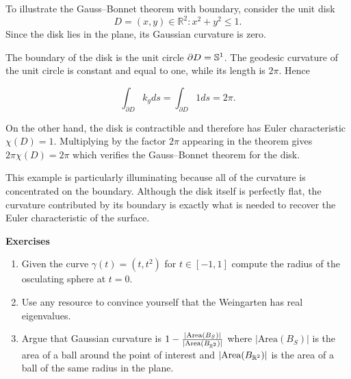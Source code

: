 To illustrate the Gauss--Bonnet theorem with boundary, consider the unit disk
$$D={(x,y)\in \mathbb{R}^2 : x^2+y^2\leq 1}.$$
Since the disk lies in the plane, its Gaussian curvature is zero.

The boundary of the disk is the unit circle $\partial D=\mathbb{S}^1$. The geodesic curvature of the unit circle is constant and equal to one, while its length is $2\pi$. Hence

$$\int_{\partial D} k_gds = \int_{\partial D} 1ds=2\pi.$$

On the other hand, the disk is contractible and therefore has Euler characteristic
$\chi(D)=1.$
Multiplying by the factor $2\pi$ appearing in the theorem gives
$2\pi\chi(D)=2\pi$
which verifies the Gauss--Bonnet theorem for the disk.

This example is particularly illuminating because all of the curvature is concentrated on the boundary. Although the disk itself is perfectly flat, the curvature contributed by its boundary is exactly what is needed to recover the Euler characteristic of the surface.


\noindent \textbf{Exercises}


\begin{enumerate}
	\item Given the curve $\gamma(t)=(t,t^2)$ for $t\in[-1,1]$ compute 
	the radius of the osculating sphere at $t=0.$
	
	\item Use any resource to convince yourself that the Weingarten has real eigenvalues.
	
	\item Argue that  Gaussian curvature is $1-\frac{|\text{Area}(B_S)|}{|\text{Area}(B_{\mathbb{R}^2})|}$
	where $|\text{Area}(B_S)|$ is the area of a ball around the point of interest and $|\text{Area}(B_{\mathbb{R}^2})|$ is the area of a ball of the same radius in the plane.
	
\end{enumerate}

\pagebreak